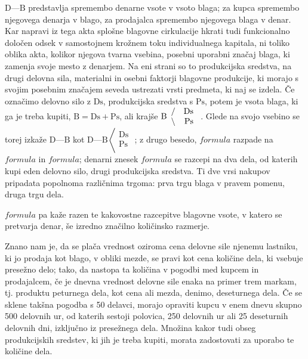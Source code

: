 \documentclass[a5paper]{scrbook}
\newcommand{\D}{\textrm{D}}
\newcommand{\crta}{\textrm{---}}
\newcommand{\B}{\textrm{B}}
\newcommand{\Ds}{\textrm{Ds}}
\newcommand{\Ps}{\textrm{Ps}}
\begin{document}
\( \D\crta\B \) predstavlja spremembo denarne vsote v vsoto blaga; za kupca spremembo njegovega denarja v blago, za prodajalca spremembo njegovega blaga v denar. Kar napravi iz tega akta splošne blagovne cirkulacije hkrati tudi funkcionalno določen odsek v samostojnem krožnem toku individualnega kapitala, ni toliko oblika akta, kolikor njegova tvarna vsebina, posebni uporabni značaj blaga, ki zamenja svoje mesto z denarjem. Na eni strani so to produkcijska sredstva, na drugi delovna sila, materialni in osebni faktorji blagovne produkcije, ki morajo s svojim posebnim značajem seveda ustrezati vrsti predmeta, ki naj se izdela. Če označimo delovno silo z \( \Ds \), produkcijska sredstva s \( \Ps \), potem je vsota blaga, ki ga je treba kupiti, \( \B=\Ds+\Ps \), ali krajše 
\( 
    \B
    \begin{array}{l r}
        \slash & \Ds\\
        \backslash & \Ps\\
    \end{array}
\)
. Glede na svojo vsebino se torej izkaže \( \D\crta\B \) kot 
\( 
    \D\crta\B\left< 
    \begin{array}{l}
        \Ds\\
        \Ps\\
    \end{array}
    \right. 
\)
; z drugo besedo, \( formula \) razpade na \( formula \) in \( formula \); denarni znesek \( formula \) se razcepi na dva dela, od katerih kupi eden delovno silo, drugi produkcijska sredstva. Ti dve vrsi nakupov pripadata popolnoma različnima trgoma: prva trgu blaga v pravem pomenu, druga trgu dela.

\( formula \) pa kaže razen te kakovostne razcepitve blagovne vsote, v katero se pretvarja denar, še izredno značilno količinsko razmerje.

Znano nam je, da se plača vrednost oziroma cena delovne sile njenemu lastniku, ki jo prodaja kot blago, v obliki mezde, se pravi kot cena količine dela, ki vsebuje presežno delo; tako, da nastopa ta količina v pogodbi med kupcem in prodajalcem, če je dnevna vrednost delovne sile enaka na primer trem markam, tj. produktu peturnega dela, kot cena ali mezda, denimo, deseturnega dela. Če se sklene takšna pogodba s 50 delavci, morajo opraviti kupcu v enem dnevu skupno 500 delovnih ur, od katerih sestoji polovica, 250 delovnih ur ali 25 deseturnih delovnih dni, izključno iz presežnega dela. Množina kakor tudi obseg produkcijskih sredstev, ki jih je treba kupiti, morata zadostovati za uporabo te količine dela.
\end{document}
